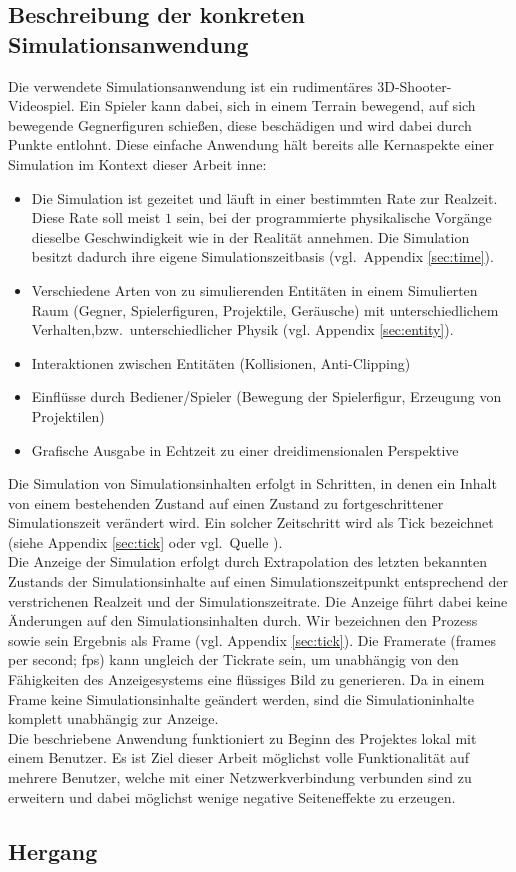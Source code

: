 \subsection{Beschreibung der konkreten Simulationsanwendung}
Die verwendete Simulationsanwendung ist ein rudimentäres 3D-Shooter-Videospiel. Ein Spieler kann dabei, sich in einem Terrain bewegend, auf sich bewegende Gegnerfiguren schießen, diese beschädigen und wird dabei durch Punkte entlohnt. Diese einfache Anwendung hält bereits alle Kernaspekte einer Simulation im Kontext dieser Arbeit inne:
\begin{itemize}
\item Die Simulation ist gezeitet und läuft in einer bestimmten Rate zur Realzeit. Diese Rate soll meist $1$ sein, bei der programmierte physikalische Vorgänge dieselbe Geschwindigkeit wie in der Realität annehmen. Die Simulation besitzt dadurch ihre eigene Simulationszeitbasis (vgl.~Appendix \ref{sec:time}).
\item Verschiedene Arten von zu simulierenden Entitäten in einem Simulierten Raum (Gegner, Spielerfiguren, Projektile, Geräusche) mit unterschiedlichem Verhalten,bzw.~unterschiedlicher Physik (vgl. Appendix \ref{sec:entity}).
\item Interaktionen zwischen Entitäten (Kollisionen, Anti-Clipping)
\item Einflüsse durch Bediener/Spieler (Bewegung der Spielerfigur, Erzeugung von Projektilen)
\item Grafische Ausgabe in Echtzeit zu einer dreidimensionalen Perspektive
\end{itemize}

Die Simulation von Simulationsinhalten erfolgt in Schritten, in denen ein Inhalt von einem bestehenden Zustand auf einen Zustand zu fortgeschrittener Simulationszeit verändert wird. Ein solcher Zeitschritt wird als Tick bezeichnet (siehe Appendix \ref{sec:tick} oder vgl.~Quelle \cite{tick}).\\
Die Anzeige der Simulation erfolgt durch Extrapolation des letzten bekannten Zustands der Simulationsinhalte auf einen Simulationszeitpunkt entsprechend der verstrichenen Realzeit und der Simulationszeitrate. Die Anzeige führt dabei keine Änderungen auf den Simulationsinhalten durch. Wir bezeichnen den Prozess sowie sein Ergebnis als Frame (vgl. Appendix \ref{sec:tick}).
Die Framerate (frames per second; fps) kann ungleich der Tickrate sein, um unabhängig von den Fähigkeiten des Anzeigesystems eine flüssiges Bild zu generieren. Da in einem Frame keine Simulationsinhalte geändert werden, sind die Simulationinhalte komplett unabhängig zur Anzeige.\\
Die beschriebene Anwendung funktioniert zu Beginn des Projektes lokal mit einem Benutzer. Es ist Ziel dieser Arbeit möglichst volle Funktionalität auf mehrere Benutzer, welche mit einer Netzwerkverbindung verbunden sind zu erweitern und dabei möglichst wenige negative Seiteneffekte zu erzeugen.

\subsection{Hergang}
